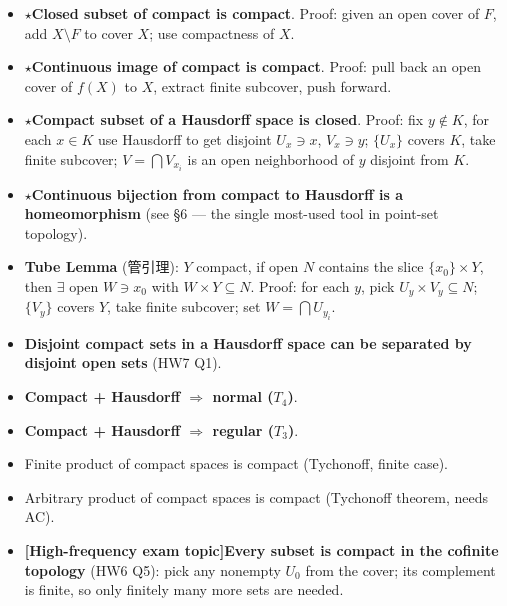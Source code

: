 \documentclass{article}
\newcommand{\starKey}{\textcolor{red!65!black}{\textbf{$\star$}}}
\newcommand{\examKey}{\textcolor{red!65!black}{\textbf{[High-frequency exam topic]}}}
\begin{document}
\begin{itemize}
  \item \starKey \textbf{Closed subset of compact is compact}.
  Proof: given an open cover of $F$, add $X\setminus F$ to cover $X$; use compactness of $X$.

  \item \starKey \textbf{Continuous image of compact is compact}.
  Proof: pull back an open cover of $f(X)$ to $X$, extract finite subcover, push forward.

  \item \starKey \textbf{Compact subset of a Hausdorff space is closed}.
  Proof: fix $y\notin K$, for each $x\in K$ use Hausdorff to get disjoint
  $U_x\ni x$, $V_x\ni y$; $\{U_x\}$ covers $K$, take finite subcover;
  $V=\bigcap V_{x_i}$ is an open neighborhood of $y$ disjoint from $K$.

  \item \starKey \textbf{Continuous bijection from compact to Hausdorff is a homeomorphism}
  (see \S6 --- the single most-used tool in point-set topology).

  \item \textbf{Tube Lemma} (管引理): $Y$ compact, if open $N$ contains the slice
  $\{x_0\}\times Y$, then $\exists$ open $W\ni x_0$ with $W\times Y\subseteq N$.
  Proof: for each $y$, pick $U_y\times V_y\subseteq N$; $\{V_y\}$ covers $Y$,
  take finite subcover; set $W=\bigcap U_{y_i}$.

  \item \textbf{Disjoint compact sets in a Hausdorff space can be separated by
  disjoint open sets} (HW7 Q1).

  \item \textbf{Compact + Hausdorff $\Rightarrow$ normal ($T_4$)}.

  \item \textbf{Compact + Hausdorff $\Rightarrow$ regular ($T_3$)}.

  \item Finite product of compact spaces is compact (Tychonoff, finite case).

  \item Arbitrary product of compact spaces is compact (Tychonoff theorem, needs AC).

  \item \examKey \textbf{Every subset is compact in the cofinite topology} (HW6 Q5):
  pick any nonempty $U_0$ from the cover; its complement is finite, so only finitely many
  more sets are needed.


\end{itemize}
\end{document}
